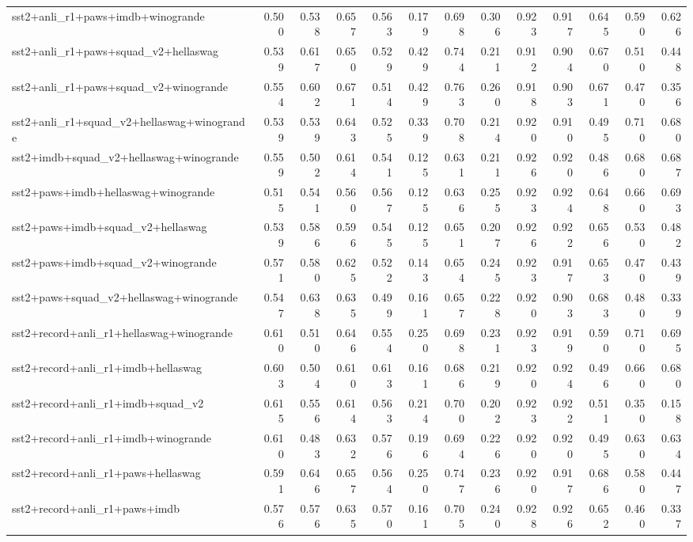 \begin{table}[t]
\begin{tabular}{lrrrrrrrrrrrr}
    sst2+anli\_r1+paws+imdb+winogrande & 0.500 & 0.538 & 0.657 & 0.563 & 0.179 & 0.698 & 0.306 & 0.923 & 0.917 & 0.645 & 0.590 & 0.626 \\
    sst2+anli\_r1+paws+squad\_v2+hellaswag & 0.539 & 0.617 & 0.650 & 0.529 & 0.429 & 0.744 & 0.211 & 0.912 & 0.904 & 0.670 & 0.510 & 0.448 \\
    sst2+anli\_r1+paws+squad\_v2+winogrande & 0.554 & 0.602 & 0.671 & 0.514 & 0.429 & 0.763 & 0.260 & 0.918 & 0.903 & 0.671 & 0.470 & 0.356 \\
    sst2+anli\_r1+squad\_v2+hellaswag+winogrande & 0.539 & 0.539 & 0.643 & 0.525 & 0.339 & 0.708 & 0.214 & 0.920 & 0.910 & 0.495 & 0.710 & 0.680 \\
    sst2+imdb+squad\_v2+hellaswag+winogrande & 0.559 & 0.502 & 0.614 & 0.541 & 0.125 & 0.631 & 0.211 & 0.926 & 0.920 & 0.486 & 0.680 & 0.687 \\
    sst2+paws+imdb+hellaswag+winogrande & 0.515 & 0.541 & 0.560 & 0.567 & 0.125 & 0.636 & 0.255 & 0.923 & 0.924 & 0.648 & 0.660 & 0.693 \\
    sst2+paws+imdb+squad\_v2+hellaswag & 0.539 & 0.586 & 0.596 & 0.545 & 0.125 & 0.651 & 0.207 & 0.926 & 0.922 & 0.656 & 0.530 & 0.482 \\
    sst2+paws+imdb+squad\_v2+winogrande & 0.571 & 0.580 & 0.625 & 0.522 & 0.143 & 0.654 & 0.245 & 0.923 & 0.917 & 0.653 & 0.470 & 0.439 \\
    sst2+paws+squad\_v2+hellaswag+winogrande & 0.547 & 0.638 & 0.635 & 0.499 & 0.161 & 0.657 & 0.228 & 0.920 & 0.903 & 0.683 & 0.480 & 0.339 \\
    sst2+record+anli\_r1+hellaswag+winogrande & 0.610 & 0.510 & 0.646 & 0.554 & 0.250 & 0.698 & 0.231 & 0.923 & 0.919 & 0.590 & 0.710 & 0.695 \\
    sst2+record+anli\_r1+imdb+hellaswag & 0.603 & 0.504 & 0.610 & 0.613 & 0.161 & 0.686 & 0.219 & 0.920 & 0.924 & 0.496 & 0.660 & 0.680 \\
    sst2+record+anli\_r1+imdb+squad\_v2 & 0.615 & 0.556 & 0.614 & 0.563 & 0.214 & 0.700 & 0.202 & 0.923 & 0.922 & 0.511 & 0.350 & 0.158 \\
    sst2+record+anli\_r1+imdb+winogrande & 0.610 & 0.483 & 0.632 & 0.576 & 0.196 & 0.694 & 0.226 & 0.920 & 0.920 & 0.495 & 0.630 & 0.634 \\
    sst2+record+anli\_r1+paws+hellaswag & 0.591 & 0.646 & 0.657 & 0.564 & 0.250 & 0.747 & 0.236 & 0.920 & 0.917 & 0.686 & 0.580 & 0.447 \\
    sst2+record+anli\_r1+paws+imdb & 0.576 & 0.576 & 0.635 & 0.570 & 0.161 & 0.705 & 0.240 & 0.928 & 0.926 & 0.652 & 0.460 & 0.337 \\

\end{tabular}
\end{table}
